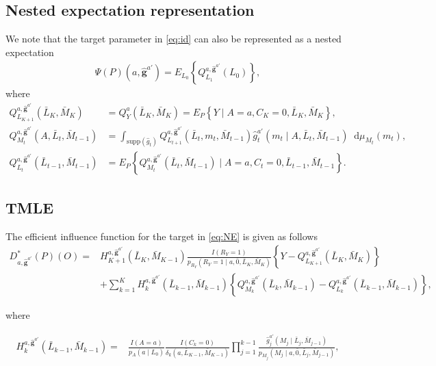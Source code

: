 \documentclass[AMA,STIX1COL]{WileyNJD-v2}
\newcommand*\diff{\mathop{}\!\mathrm{d}}
\begin{document}
\subsection{Nested expectation representation}
We note that the target parameter in \eqref{eq:id} can also be represented as a nested expectation
\begin{align}
\label{eq:NE}
    \Psi(P)(a, \mathbf{\hat{g}}^{a'})= E_{L_0} \left\{Q^{a, \mathbf{\hat{g}}^{a'}}_{L_1}(L_0) \right\},
\end{align}
where
\begin{align*}
    Q^{a,\mathbf{\hat{g}}^{a'}}_{L_{K+1}}(\bar{L}_K, \bar{M}_K)&=Q^a_{Y}(\bar{L}_K, \bar{M}_K) =E_P\left\{Y \mid A=a, C_K=0, \bar{L}_K, \bar{M}_K \right\}, \\
    Q^{a, \mathbf{\hat{g}}^{a'}}_{M_t}(A, \bar{L}_t, \bar{M}_{t-1})
    &=\int_{\text{supp}(\hat{g}_t)} Q^{a, \mathbf{\hat{g}}^{a'}}_{ L_{t+1}}( \bar{L}_t, m_t, \bar{M}_{t-1})\hat{g}^{a'}_t(m_t \mid A, \bar{L}_t, \bar{M}_{t-1}) \diff \mu_{M_t}(m_t),\\
    Q^{a,\mathbf{\hat{g}}^{a'}}_{L_t}(\bar{L}_{t-1}, \bar{M}_{t-1})&=E_P \left\{Q^{a, \mathbf{\hat{g}}^{a'}}_{M_t}(\bar{L}_t, \bar{M}_{t-1}) \mid A=a, C_t=0, \bar{L}_{t-1}, \bar{M}_{t-1}  \right\}.
\end{align*}


\subsection{TMLE}
The efficient influence function for the target in \eqref{eq:NE} is given as follows
\begin{align*}
    \label{eq:EIF}
    D^*_{a,\mathbf{\hat{g}}^{a'}}(P)(O)= &H_{K+1}^{a, \mathbf{\hat{g}}^{a'}}(\bar{L}_K, \bar{M}_{K-1}) \frac{I(R_Y=1)}{p_{R_Y}(R_Y=1 \mid a, \bar{0}, \bar{L}_K, \bar{M}_K)}\left\{Y-Q^{a, \mathbf{\hat{g}}^{a'}}_{L_{K+1}}(\bar{L}_K, \bar{M}_K) \right\} \\
    &+\sum_{k=1}^K H_k^{a, \mathbf{\hat{g}}^{a'}}(\bar{L}_{k-1}, \bar{M}_{k-1}) \left\{Q_{M_k}^{a, \mathbf{\hat{g}}^{a'}}(\bar{L}_k, \bar{M}_{k-1})-  Q_{L_k}^{a, \mathbf{\hat{g}}^{a'}}(\bar{L}_{k-1}, \bar{M}_{k-1})\right\}, 
\end{align*}

where 

\begin{align*}
    H_k^{a, \mathbf{\hat{g}}^{a'}}(\bar{L}_{k-1}, \bar{M}_{k-1}) =& \frac{I(A=a)}{p_A(a\mid L_0)}\frac{I(C_k=0)}{\delta_k(a, \bar{L}_{K-1}, \bar{M}_{K-1})}\prod_{j=1}^{k-1}\frac{\hat{g}^{a'}_j(M_j \mid \bar{L}_j, \bar{M}_{j-1})}{p_{M_j}(M_j \mid a,\bar{0}, \bar{L}_j, \bar{M}_{j-1})},
\end{align*}
\end{document}
